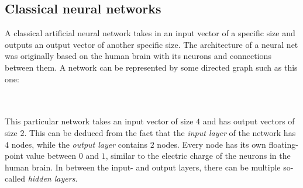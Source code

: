 \documentclass[12pt, titlepage]{article}
\begin{document}
    \subsection{Classical neural networks}
    A classical artificial neural network takes in an input vector of a specific size and outputs an output vector of another specific size. The architecture of a neural net was originally based on the human brain with its neurons and connections between them. A network can be represented by some directed graph such as this one:    \\\\
    \\
    This particular network takes an input vector of size $4$ and has output vectors of size $2$. This can be deduced from the fact that the \textit{input layer} of the network has $4$ nodes, while the \textit{output layer} contains $2$ nodes. Every node has its own floating-point value between $0$ and $1$, similar to the electric charge of the neurons in the human brain. In between the input- and output layers, there can be multiple so-called \textit{hidden layers}.
    
\end{document}
